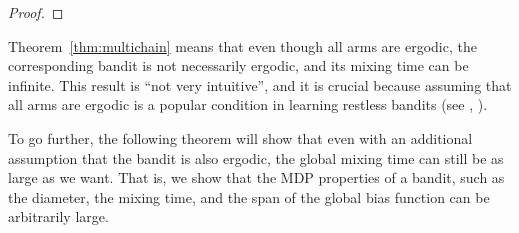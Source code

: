 \begin{proof}

\end{proof}

Theorem~\ref{thm:multichain} means that even though all arms are ergodic, the corresponding bandit is not necessarily ergodic, and its mixing time can be infinite.
This result is ``not very intuitive'', and it is crucial because assuming that all arms are ergodic is a popular condition in learning restless bandits (see \eg, \cite{ortner2012regret, jung2019thompson}).

To go further, the following theorem will show that even with an additional assumption that the bandit is also ergodic, the global mixing time can still be as large as we want.
That is, we show that the MDP properties of a bandit, such as the diameter, the mixing time, and the span of the global bias function can be arbitrarily large.

